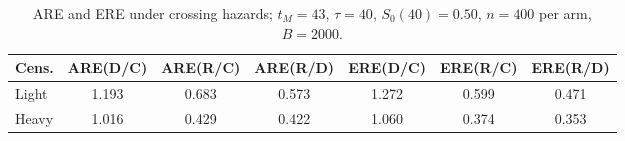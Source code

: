 \documentclass[12pt]{article}
\begin{document}
\begin{table}[ht]
\centering
\caption{ARE and ERE under crossing hazards; $t_M=43$, $\tau=40$, $S_0(40)=0.50$, $n=400$ per arm, $B=2000$.}
\label{tab:sim-crossing}
\begin{tabular}{lcccccc}
\toprule
Cens. & ARE(D/C) & ARE(R/C) & ARE(R/D) & ERE(D/C) & ERE(R/C) & ERE(R/D)
\\
\midrule
Light & 1.193 & 0.683 & 0.573 & 1.272 & 0.599 & 0.471 \\
\midrule
Heavy & 1.016 & 0.429 & 0.422 & 1.060 & 0.374 & 0.353 \\
\bottomrule
\end{tabular}
\end{table}















\end{document}
